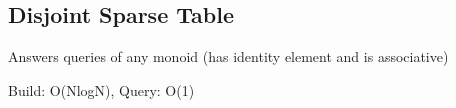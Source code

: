 \subsection{Disjoint Sparse Table}
Answers queries of any monoid (has identity element and is associative)

Build: O(NlogN), Query: O(1)
